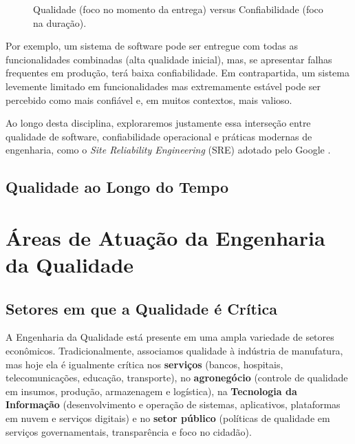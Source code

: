 \documentclass[12pt,a4paper]{report}
\begin{document}
\begin{figure}[h]
    \centering
    \caption{Qualidade (foco no momento da entrega) versus Confiabilidade (foco na duração).}
\end{figure}

Por exemplo, um sistema de software pode ser entregue com todas as
funcionalidades combinadas (alta qualidade inicial), mas, se apresentar
falhas frequentes em produção, terá baixa confiabilidade. Em contrapartida,
um sistema levemente limitado em funcionalidades mas extremamente estável
pode ser percebido como mais confiável e, em muitos contextos, mais valioso.

Ao longo desta disciplina, exploraremos justamente essa interseção entre
qualidade de software, confiabilidade operacional e práticas modernas de
engenharia, como o \emph{Site Reliability Engineering} (SRE) adotado pelo
Google \cite{beyer2016sre, googlesre2024}.

\subsection{Qualidade ao Longo do Tempo}

\section{Áreas de Atuação da Engenharia da Qualidade}

\subsection{Setores em que a Qualidade é Crítica}

A Engenharia da Qualidade está presente em uma ampla variedade de setores
econômicos. Tradicionalmente, associamos qualidade à indústria de
manufatura, mas hoje ela é igualmente crítica nos \textbf{serviços} (bancos,
hospitais, telecomunicações, educação, transporte), no \textbf{agronegócio}
(controle de qualidade em insumos, produção, armazenagem e logística), na
\textbf{Tecnologia da Informação} (desenvolvimento e operação de sistemas,
aplicativos, plataformas em nuvem e serviços digitais) e no \textbf{setor
público} (políticas de qualidade em serviços governamentais, transparência e
foco no cidadão).
\end{document}
